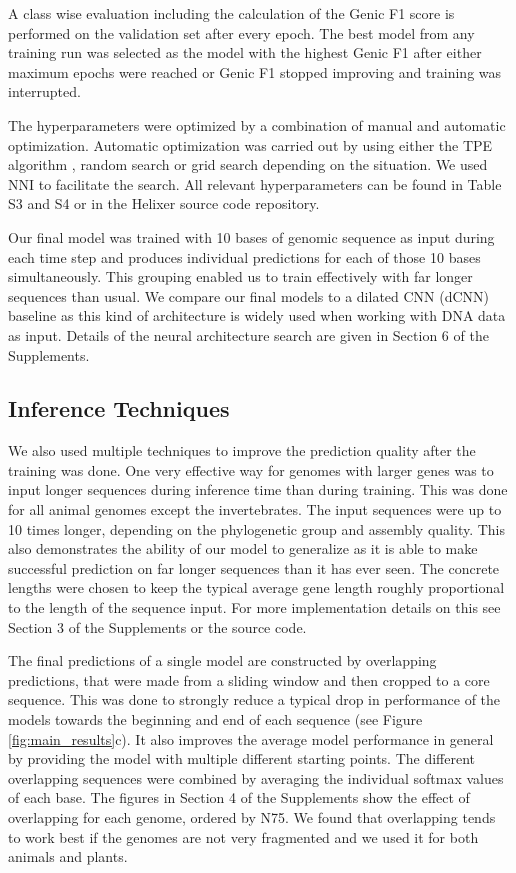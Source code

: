\documentclass{bioinfo}
\begin{document}
\begin{methods}
A class wise evaluation including the calculation of the Genic 
F1 score is performed on the validation set after every epoch. The best model
from any training run was selected as the model with the highest Genic F1 after either
maximum epochs were reached or Genic F1 stopped improving and training was interrupted.

The hyperparameters were optimized by a combination of manual and automatic 
optimization. Automatic optimization was carried out by using either the TPE 
algorithm \citep{bergstra2011algorithms}, random search or grid search depending on 
the situation. We used NNI \citep{nni2019} to facilitate the search. All relevant 
hyperparameters can be found in Table S3 and S4 or in the Helixer source code 
repository. 
	
Our final model was trained with 10 bases of genomic sequence as input during each 
time step and produces individual predictions for each of those 10 bases 
simultaneously. This grouping enabled us to train effectively with far longer 
sequences than usual. 
We compare our final models to a dilated CNN (dCNN) baseline as this kind of architecture is 
widely used when working with DNA data as input. Details of the neural architecture 
search are given in Section 6 of the Supplements.

\subsection{Inference Techniques}
We also used multiple techniques to improve the prediction quality after the 
training was done. One very effective way for genomes with larger genes was to input 
longer sequences during inference time than during training. This was done for all 
animal genomes except the invertebrates. The input sequences were up to 10 times 
longer, depending on the phylogenetic group and assembly quality. This also demonstrates the 
ability of our model to generalize as it is able to make successful prediction on 
far longer sequences than it has ever seen. The 
concrete lengths were chosen to keep the typical average gene length roughly 
proportional to the length of the sequence input. For more implementation details 
on this see Section 3 of the Supplements or the source code.
	
The final predictions of a single model are constructed by overlapping predictions, 
that were made from a sliding window and then cropped to a core sequence. This was done 
to strongly reduce a typical drop in performance of the models towards the beginning 
and end of each sequence (see Figure \ref{fig:main_results}c). It also improves the 
average model performance in general by providing the model with multiple different 
starting points. The different overlapping sequences were combined by averaging 
the individual softmax values of each base. The figures in Section 4 of the 
Supplements show the effect of overlapping for each genome, ordered by N75. We found 
that overlapping tends to work best if the genomes are not very fragmented and we 
used it for both animals and plants.


\end{methods}
\end{document}

